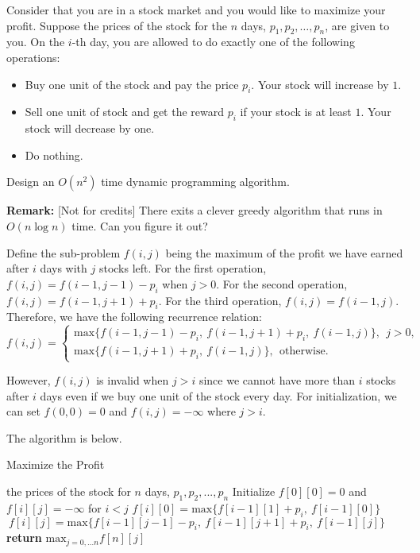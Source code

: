 \documentclass{oxmathproblems}
\begin{document}
\begin{questions}

\miquestion [30]
Consider that you are in a stock market and you would like to maximize your profit. Suppose the prices of the stock for the $n$ days, $p_1,p_2,\ldots,p_n$, are given to you. On the $i$-th day, you are allowed to do exactly one of the following operations:
     \begin{itemize}
         \item Buy one unit of the stock and pay the price $p_i$. Your stock will increase by $1$.
         \item Sell one unit of stock and get the reward $p_i$ if your stock is at least $1$. Your stock will decrease by one.
         \item Do nothing.
     \end{itemize}
    Design an $O(n^2)$ time dynamic programming algorithm.

    \textbf{Remark:} [Not for credits] There exits a clever greedy algorithm that runs in $O(n\log n)$ time. Can you figure it out? 

\begin{Solution}

Define the sub-problem $f(i, j)$ being the maximum of the profit we have earned after $i$ days with $j$ stocks left. For the first operation, $f(i, j)=f(i-1, j-1)-p_i$ when $j>0$. For the second operation, $f(i, j)=f(i-1, j+1)+p_i$. For the third operation, $f(i, j)=f(i-1, j)$. Therefore, we have the following recurrence relation:
$$
    f(i, j)=\left\{
                \begin{array}{ll}
                  \text{max}\{f(i-1, j-1)-p_i,\ f(i-1,j+1)+p_i,\ f(i-1,j)\},\ \ j>0,\\
                  \text{max}\{f(i-1,j+1)+p_i,\ f(i-1,j)\},\ \ \text{otherwise.}
                \end{array}
              \right.
$$

However, $f(i, j)$ is invalid when $j>i$ since we cannot have more than $i$ stocks after $i$ days even if we buy one unit of the stock every day. For initialization, we can set $f(0,0)=0$ and $f(i,j)=-\infty$ where $j>i$.

The algorithm is below.

\begin{algorithm}[H]
    \caption{Maximize the Profit}
    \label{}
    \renewcommand{\algorithmicrequire}{\textbf{Input:}}
    \begin{algorithmic}[1]
        \Require the prices of the stock for $n$ days, $p_1,p_2,...,p_n$
        \State Initialize $f[0][0]=0$ and $f[i][j]=-\infty$ for $i<j$
        \State $f[i][0]=\text{max}\{f[i-1][1]+p_i,\ f[i-1][0]\}$
        \State $\ f[i][j]=\text{max}\{f[i-1][j-1]-p_i,\ f[i-1][j+1]+p_i,\ f[i-1][j]\}$
        \EndFor
        \EndFor
        \State \textbf{return} $\text{max}_{j=0,...n}f[n][j]$
    \end{algorithmic}
\end{algorithm}


\end{Solution}
\end{questions}
\end{document}
